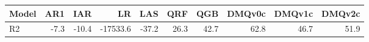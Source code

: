\begin{tabular}{lrrrrrrrrr}
\toprule
Model & AR1 & IAR & LR & LAS & QRF & QGB & DMQv0c & DMQv1c & DMQv2c \\
\midrule
R2 & -7.3 & -10.4 & -17533.6 & -37.2 & 26.3 & 42.7 & 62.8 & 46.7 & 51.9 \\
\bottomrule
\end{tabular}
